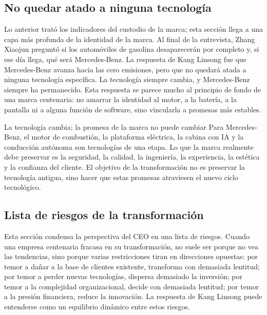 \documentclass[a4paper]{article}
\begin{document}
\subsection{No quedar atado a ninguna tecnología}

Lo anterior trató los indicadores del custodio de la marca; esta sección llega a una capa más profunda de la identidad de la marca. Al final de la entrevista, Zhang Xiaojun preguntó si los automóviles de gasolina desaparecerán por completo y, si ese día llega, qué será Mercedes-Benz. La respuesta de Kang Linsong fue que Mercedes-Benz avanza hacia las cero emisiones, pero que no quedará atada a ninguna tecnología específica. La tecnología siempre cambia, y Mercedes-Benz siempre ha permanecido. Esta respuesta se parece mucho al principio de fondo de una marca centenaria: no amarrar la identidad al motor, a la batería, a la pantalla ni a alguna función de software, sino vincularla a promesas más estables.

\begin{importantbox}{La tecnología cambia; la promesa de la marca no puede cambiar}
Para Mercedes-Benz, el motor de combustión, la plataforma eléctrica, la cabina con IA y la conducción autónoma son tecnologías de una etapa. Lo que la marca realmente debe preservar es la seguridad, la calidad, la ingeniería, la experiencia, la estética y la confianza del cliente. El objetivo de la transformación no es preservar la tecnología antigua, sino hacer que estas promesas atraviesen el nuevo ciclo tecnológico.
\end{importantbox}

\subsection{Lista de riesgos de la transformación}

Esta sección condensa la perspectiva del CEO en una lista de riesgos. Cuando una empresa centenaria fracasa en su transformación, no suele ser porque no vea las tendencias, sino porque varias restricciones tiran en direcciones opuestas: por temor a dañar a la base de clientes existente, transforma con demasiada lentitud; por temor a perder nuevas tecnologías, dispersa demasiado la inversión; por temor a la complejidad organizacional, decide con demasiada lentitud; por temor a la presión financiera, reduce la innovación. La respuesta de Kang Linsong puede entenderse como un equilibrio dinámico entre estos riesgos.
\end{document}
